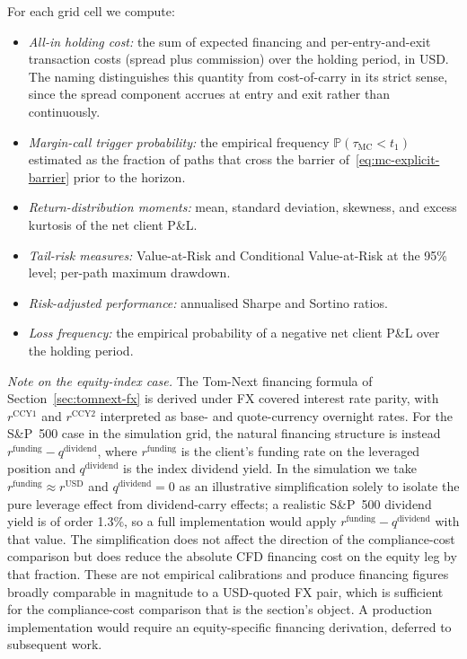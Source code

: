 \documentclass[preprint,12pt,authoryear]{elsarticle}
\newcommand{\PP}{\mathbb{P}}
\theoremstyle{definition}
\begin{document}
For each grid cell we compute:
\begin{itemize}
    \item \emph{All-in holding cost:} the sum of expected
    financing and per-entry-and-exit transaction costs (spread
    plus commission) over the holding period, in USD. The
    naming distinguishes this quantity from cost-of-carry in
    its strict sense, since the spread component accrues at
    entry and exit rather than continuously.
    \item \emph{Margin-call trigger probability:} the empirical
    frequency $\PP(\tau_{\text{MC}} < t_1)$ estimated as the
    fraction of paths that cross the barrier
    of~\eqref{eq:mc-explicit-barrier} prior to the horizon.
    \item \emph{Return-distribution moments:} mean, standard
    deviation, skewness, and excess kurtosis of the net client
    P\&L.
    \item \emph{Tail-risk measures:} Value-at-Risk and
    Conditional Value-at-Risk at the 95\% level; per-path
    maximum drawdown.
    \item \emph{Risk-adjusted performance:} annualised Sharpe
    and Sortino ratios.
    \item \emph{Loss frequency:} the empirical probability of a
    negative net client P\&L over the holding period.
\end{itemize}
\emph{Note on the equity-index case.} The Tom-Next financing
formula of Section~\ref{sec:tomnext-fx} is derived under FX
covered interest rate parity, with $r^{\text{CCY1}}$ and
$r^{\text{CCY2}}$ interpreted as base- and quote-currency
overnight rates. For the S\&P~500 case in the simulation grid,
the natural financing structure is instead
$r^{\text{funding}} - q^{\text{dividend}}$, where
$r^{\text{funding}}$ is the client's funding rate on the
leveraged position and $q^{\text{dividend}}$ is the index
dividend yield. In the simulation we take
$r^{\text{funding}} \approx r^{\text{USD}}$ and
$q^{\text{dividend}} = 0$ as an illustrative simplification
solely to isolate the pure leverage effect from dividend-carry
effects; a realistic S\&P~500 dividend yield is of order 1.3\%,
so a full implementation would apply
$r^{\text{funding}} - q^{\text{dividend}}$ with that value.
The simplification does not affect the direction of the
compliance-cost comparison but does reduce the absolute CFD
financing cost on the equity leg by that fraction. These are
not empirical calibrations and produce financing
figures broadly comparable in magnitude to a USD-quoted FX
pair, which is sufficient for the compliance-cost comparison
that is the section's object. A production implementation would
require an equity-specific financing derivation, deferred to
subsequent work.
\end{document}

